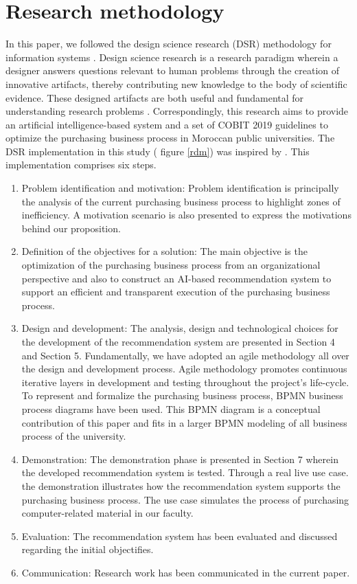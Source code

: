 \documentclass[preprint,3p,onecolumn]{elsarticle}
\begin{document}
\section{Research methodology}
\par In this paper, we followed the design science research (DSR) methodology for information systems \citep{peffers2012design}. Design science research is a research paradigm wherein a designer answers questions relevant to human problems through the creation of innovative artifacts, thereby contributing new knowledge to the body of scientific evidence. These designed artifacts are both useful and fundamental for understanding research problems \citep{hevner2010design}. Correspondingly, this research aims to provide an artificial intelligence-based system and a set of COBIT 2019 guidelines to optimize the purchasing business process in Moroccan public universities. The DSR implementation in this study ( figure \ref{rdm}) was inspired by \citep{peffers2007design} \citep{hevner2010design} \citep{hevner2004design} \citep{hevner2004design}. This implementation comprises six steps.
\begin{enumerate}
\item Problem identification and motivation: Problem identification is principally the analysis of the current purchasing business process to highlight zones of inefficiency. A motivation scenario is also presented to express the motivations behind our proposition.
\item Definition of the objectives for a solution: The main objective is the optimization of the purchasing business process from an organizational perspective and also to construct an AI-based recommendation system to support an efficient and transparent execution of the purchasing business process.
\item Design and development: The analysis, design and technological choices for the development of the recommendation system are presented in Section 4 and Section 5. Fundamentally, we have adopted an agile methodology \citep{ highsmith2002agile} all over the design and development process. Agile methodology promotes continuous iterative layers in development and testing throughout the project's life-cycle. To represent and formalize the purchasing business process, BPMN business process diagrams \citep{white2004introduction} have been used. This BPMN diagram is a conceptual contribution of this paper and fits in a larger BPMN modeling of all business process of the university.
\item Demonstration: The demonstration phase is presented in Section 7 wherein the developed recommendation system is tested. Through a real live use case. the demonstration illustrates how the recommendation system supports the purchasing business process. The use case simulates the process of purchasing computer-related material in our faculty.
\item Evaluation: The recommendation system has been evaluated and discussed regarding the initial objectifies. 
\item Communication: Research work has been communicated in the current paper.
\end{enumerate}
\end{document}
